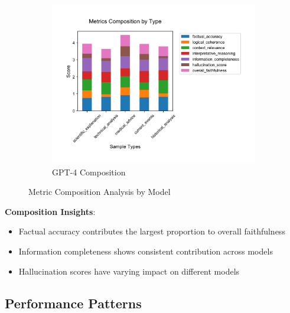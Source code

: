 \begin{figure}[!htbp]
\hfill
\begin{subfigure}[b]{0.32\textwidth}
    \includegraphics[width=\textwidth]{figures/visualization/metrics_stacked_bar_gpt-4.png}
    \caption{GPT-4 Composition}
    \label{fig:metrics_stacked_bar_gpt4}
\end{subfigure}
\caption{Metric Composition Analysis by Model}
\label{fig:metrics_stacked_bars}
\end{figure}

\textbf{Composition Insights}:
\begin{itemize}
    \item Factual accuracy contributes the largest proportion to overall faithfulness
    \item Information completeness shows consistent contribution across models
    \item Hallucination scores have varying impact on different models
\end{itemize}

\subsection{Performance Patterns}

